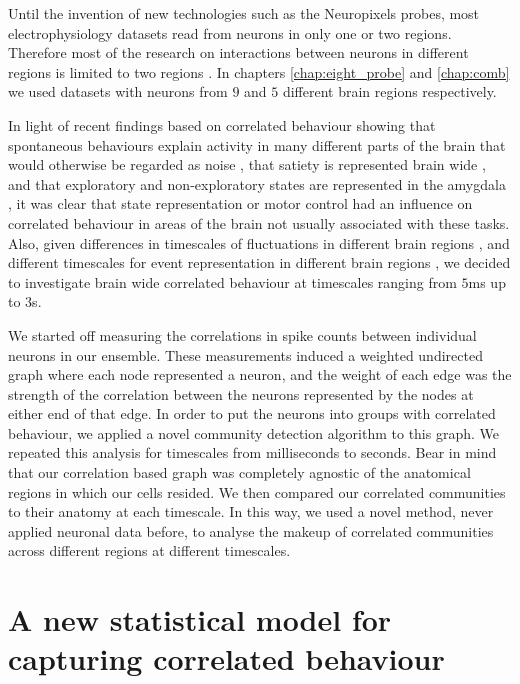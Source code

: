 Until the invention of new technologies such as the Neuropixels probes, most electrophysiology datasets read from neurons in only one or two regions. Therefore most of the research on interactions between neurons in different regions is limited to two regions \parencite{wierzynski, patterson, girard}. In chapters \ref{chap:eight_probe} and \ref{chap:comb} we used datasets with neurons from $9$ and $5$ different brain regions respectively.


In light of recent findings based on correlated behaviour showing that spontaneous behaviours explain activity in many different parts of the brain that would otherwise be regarded as noise \parencite{stringer}, that satiety is represented brain wide \parencite{allen}, and that exploratory and non-exploratory states are represented in the amygdala \parencite{grundemann}, it was clear that state representation or motor control had an influence on correlated behaviour in areas of the brain not usually associated with these tasks. Also, given differences in timescales of fluctuations in different brain regions \parencite{murray}, and different timescales for event representation in different brain regions \parencite{baldassano}, we decided to investigate brain wide correlated behaviour at timescales ranging from $5$ms up to $3$s.

We started off measuring the correlations in spike counts between individual neurons in our ensemble. These measurements induced a weighted undirected graph where each node represented a neuron, and the weight of each edge was the strength of the correlation between the neurons represented by the nodes at either end of that edge. In order to put the neurons into groups with correlated behaviour, we applied a novel community detection algorithm \parencite{humphries} to this graph. We repeated this analysis for timescales from milliseconds to seconds. Bear in mind that our correlation based graph was completely agnostic of the anatomical regions in which our cells resided. We then compared our correlated communities to their anatomy at each timescale. In this way, we used a novel method, never applied neuronal data before, to analyse the makeup of correlated communities across different regions at different timescales.

\section{A new statistical model for capturing correlated behaviour}

